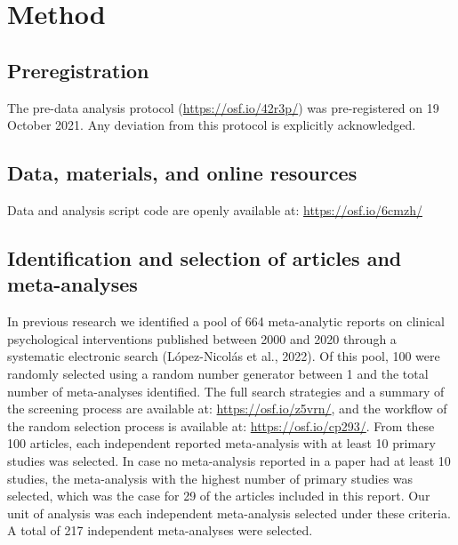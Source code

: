 \documentclass[
  ,jou, a4paper,floatsintext]{apa6}
\begin{document}
\hypertarget{method}{%
\section{Method}\label{method}}

\hypertarget{preregistration}{%
\subsection{Preregistration}\label{preregistration}}

The pre-data analysis protocol (\url{https://osf.io/42r3p/}) was pre-registered on 19 October 2021. Any deviation from this protocol is explicitly acknowledged.

\hypertarget{data-materials-and-online-resources}{%
\subsection{Data, materials, and online resources}\label{data-materials-and-online-resources}}

Data and analysis script code are openly available at: \url{https://osf.io/6cmzh/}

\hypertarget{identification-and-selection-of-articles-and-meta-analyses}{%
\subsection{Identification and selection of articles and meta-analyses}\label{identification-and-selection-of-articles-and-meta-analyses}}

In previous research we identified a pool of 664 meta-analytic reports on clinical psychological interventions published between 2000 and 2020 through a systematic electronic search (López-Nicolás et al., 2022). Of this pool, 100 were randomly selected using a random number generator between 1 and the total number of meta-analyses identified. The full search strategies and a summary of the screening process are available at: \url{https://osf.io/z5vrn/}, and the workflow of the random selection process is available at: \url{https://osf.io/cp293/}.
From these 100 articles, each independent reported meta-analysis with at least 10 primary studies was selected. In case no meta-analysis reported in a paper had at least 10 studies, the meta-analysis with the highest number of primary studies was selected, which was the case for 29 of the articles included in this report. Our unit of analysis was each independent meta-analysis selected under these criteria. A total of 217 independent meta-analyses were selected.
\end{document}
